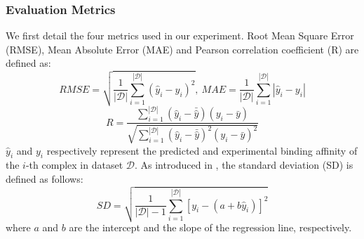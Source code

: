 \documentclass[sigconf]{acmart}
\begin{document}
\subsubsection{Evaluation Metrics}
We first detail the four metrics used in our experiment. Root Mean Square Error (RMSE), Mean Absolute Error (MAE) and Pearson correlation coefficient (R) are defined as:
\begin{equation}
    RMSE = \sqrt{\frac{1}{|\mathcal{D}|}\sum_{i=1}^{|\mathcal{D}|} (\hat{y}_i-y_i)^2},\ MAE = \frac{1}{|\mathcal{D}|}\sum_{i=1}^{|\mathcal{D}|} |\hat{y}_i-y_i| 
\end{equation}
\begin{equation}
    R = \frac{\sum_{i=1}^{|\mathcal{D}|}(\hat{y}_i-\bar{\hat{y}})(y_i-\bar{y})}{\sqrt{\sum_{i=1}^{|\mathcal{D}|}(\hat{y}_i-\bar{\hat{y}})^2(y_i-\bar{y})^2}}
\end{equation}
$\hat{y}_i$ and $y_i$ respectively represent the predicted and experimental binding affinity of the $i$-th complex in dataset $\mathcal{D}$. As introduced in \cite{stepniewska2018development}, the standard deviation (SD) is defined as follows:
\begin{equation}
    SD = \sqrt{\frac{1}{|\mathcal{D}|-1}\sum_{i=1}^{|\mathcal{D}|} [y_i - (a+b \hat{y}_i)]^2}
\end{equation}
where $a$ and $b$ are the intercept and the slope of the regression line, respectively. 
\end{document}
